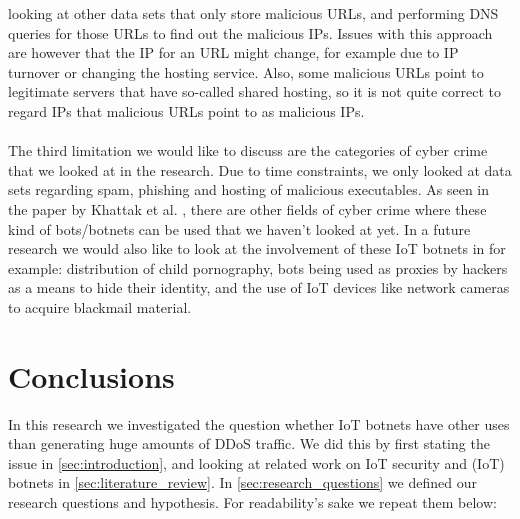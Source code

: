 \documentclass[a4paper,10pt]{article}
\begin{document}
looking at other data sets that only store malicious URLs, and performing DNS queries for those URLs to find out the malicious IPs.
Issues with this approach are however that the IP for an URL might change, for example due to IP turnover or changing the hosting
service. Also, some malicious URLs point to legitimate servers that have so-called shared hosting, so it is not quite correct to regard 
IPs that malicious URLs point to as malicious IPs.
\\\\
The third limitation we would like to discuss are the categories of cyber crime that we looked at in the research. Due to time 
constraints, we only looked at data sets regarding spam, phishing and hosting of malicious executables. As seen in the paper by 
Khattak et al. \cite{Khattak2014}, there are other fields of 
cyber crime where these kind of bots/botnets can be used that we haven't looked at yet. In a future research we would also like to 
look at the involvement of these IoT botnets in for example: distribution of child pornography, bots being used as proxies by hackers
as a means to hide their identity, and the use of IoT devices like network cameras to acquire blackmail material.

\section{Conclusions} \label{sec:conclusions}
In this research we investigated the question whether IoT botnets have other uses than generating huge amounts of DDoS traffic.
We did this by first stating the issue in \autoref{sec:introduction}, and looking at related work on IoT security and (IoT) botnets in \autoref{sec:literature_review}.
In \autoref{sec:research_questions} we defined our research questions and hypothesis. For readability's sake we repeat them below:
\end{document}
